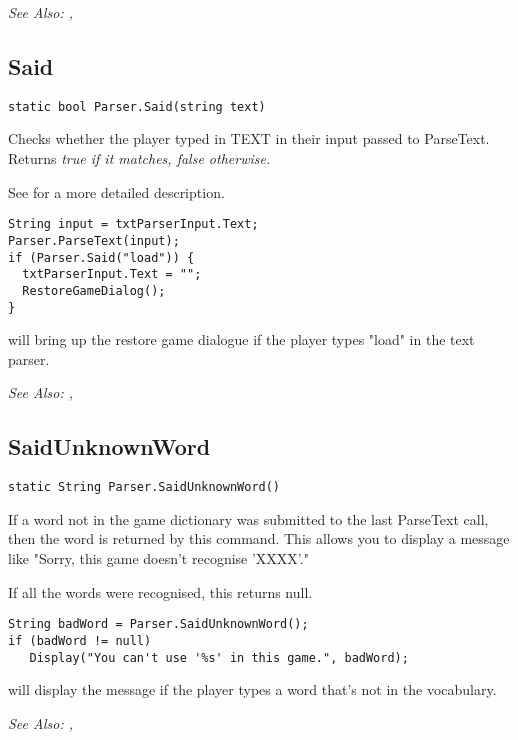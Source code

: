 \it{See Also:} ,


\subsection{Said}\label{Parser.Said}%

\begin{verbatim}
static bool Parser.Said(string text)
\end{verbatim}
Checks whether the player typed in TEXT in their input passed to ParseText.
Returns \it{true} if it matches, \it{false} otherwise.

See  for a more detailed description.


\begin{verbatim}
String input = txtParserInput.Text;
Parser.ParseText(input);
if (Parser.Said("load")) {
  txtParserInput.Text = "";
  RestoreGameDialog();
}
\end{verbatim}
will bring up the restore game dialogue if the player types "load" in the text parser.

\it{See Also:} , 


\subsection{SaidUnknownWord}\label{Parser.SaidUnknownWord}%

\begin{verbatim}
static String Parser.SaidUnknownWord()
\end{verbatim}
If a word not in the game dictionary was submitted to the last ParseText
call, then the word is returned by this command. This allows you to display a
message like "Sorry, this game doesn't recognise 'XXXX'."

If all the words were recognised, this returns null.

\begin{verbatim}
String badWord = Parser.SaidUnknownWord();
if (badWord != null)
   Display("You can't use '%s' in this game.", badWord);
\end{verbatim}
will display the message if the player types a word that's not in the vocabulary.

\it{See Also:} , 


